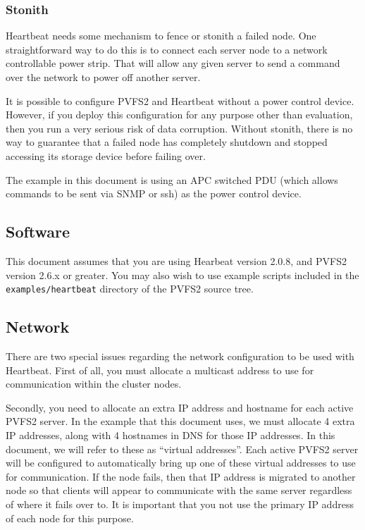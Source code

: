 \documentclass[11pt]{article}
\begin{document}
\subsubsection{Stonith}

Heartbeat needs some mechanism to fence or stonith a failed node.  One
straightforward way to do this is to connect each server node to a
network controllable power strip.  That will allow any given server to
send a command over the network to power off another server.

It is possible to configure PVFS2 and Heartbeat without a power control
device.  However, if you deploy this configuration for any purpose other
than evaluation, then you run a very serious risk of data
corruption.   Without stonith, there is no way to guarantee that a
failed node has completely shutdown and stopped accessing its
storage device before failing over.

The example in this document is using an APC switched PDU (which allows
commands to be sent via SNMP or ssh) as the power control device.

\subsection{Software}

This document assumes that you are using Hearbeat version 2.0.8, and
PVFS2 version 2.6.x or greater.  You may also wish to use example
scripts included in the \texttt{examples/heartbeat} directory of the PVFS2 source
tree.

\subsection{Network}

There are two special issues regarding the network configuration to be
used with Heartbeat.  First of all, you must allocate a multicast
address to use for communication within the cluster nodes.

Secondly, you need to allocate an extra IP address and hostname for each
active PVFS2 server.  In the example that this document uses, we must
allocate 4 extra IP addresses, along with 4 hostnames in DNS
for those IP addresses.  In this document, we will refer to these as
``virtual addresses''.  Each active PVFS2 server will be configured
to automatically bring up one of these virtual addresses to use for
communication.  If the node fails, then that IP address is migrated to
another node so that clients will appear to communicate with the same
server regardless of where it fails over to.  It is important that you
not use the primary IP address of each node for this purpose.
\end{document}
